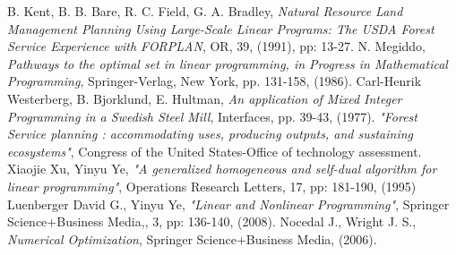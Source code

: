 \documentclass[a4paper,10 pt,titlepage,twoside]{book}
\theoremstyle{plain}
\theoremstyle{definition}
\theoremstyle{remark}
\begin{document}
\begin{thebibliography}{9}
	 B. Kent, B. B. Bare, R. C. Field, G. A. Bradley, \textit{Natural Resource Land Management Planning Using Large-Scale Linear Programs: The USDA Forest Service Experience with FORPLAN}, OR, 39, (1991), pp: 13-27.
 N. Megiddo, \emph{ Pathways to the optimal set in linear programming, in Progress in
Mathematical Programming}, Springer-Verlag, New York, pp. 131-158, (1986).
 Carl-Henrik Westerberg, B. Bjorklund, E. Hultman, \emph{ An application of Mixed Integer Programming in a Swedish Steel Mill}, Interfaces, pp. 39-43, (1977).
 \emph{"Forest Service planning : accommodating uses, producing outputs, and sustaining ecosystems"}, Congress of the United States-Office of technology assessment. 
Xiaojie Xu, Yinyu Ye, \emph{"A generalized homogeneous and self-dual algorithm for linear programming"}, Operations Research Letters, 17, pp: 181-190, (1995)
Luenberger David G., Yinyu Ye, \emph{"Linear and Nonlinear Programming"}, Springer Science+Business Media,, 3, pp: 136-140, (2008).
Nocedal J., Wright J. S., \emph{\;Numerical Optimization}, Springer Science+Business Media, (2006).

\end{thebibliography}
\end{document}
